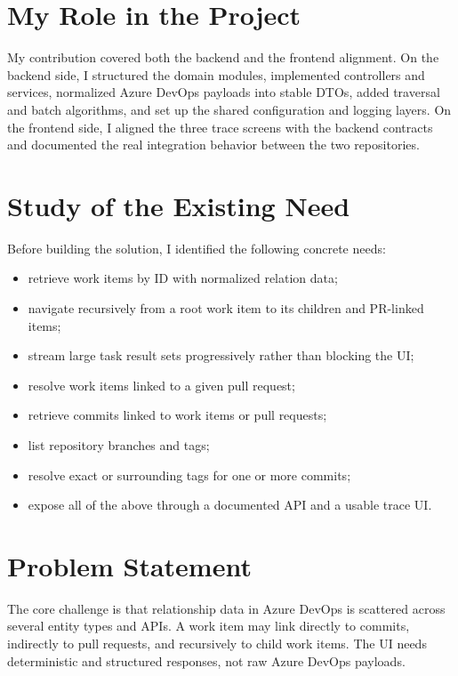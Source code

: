 \documentclass[12pt,a4paper]{report}
\begin{document}
\section{My Role in the Project}

My contribution covered both the backend and the frontend alignment. On the backend
side, I structured the domain modules, implemented controllers and services,
normalized Azure DevOps payloads into stable DTOs, added traversal and batch
algorithms, and set up the shared configuration and logging layers. On the frontend
side, I aligned the three trace screens with the backend contracts and documented
the real integration behavior between the two repositories.

\section{Study of the Existing Need}

Before building the solution, I identified the following concrete needs:

\begin{itemize}
  \item retrieve work items by ID with normalized relation data;
  \item navigate recursively from a root work item to its children and PR-linked items;
  \item stream large task result sets progressively rather than blocking the UI;
  \item resolve work items linked to a given pull request;
  \item retrieve commits linked to work items or pull requests;
  \item list repository branches and tags;
  \item resolve exact or surrounding tags for one or more commits;
  \item expose all of the above through a documented API and a usable trace UI.
\end{itemize}

\section{Problem Statement}

The core challenge is that relationship data in Azure DevOps is scattered across
several entity types and APIs. A work item may link directly to commits, indirectly
to pull requests, and recursively to child work items. The UI needs deterministic
and structured responses, not raw Azure DevOps payloads.
\end{document}
